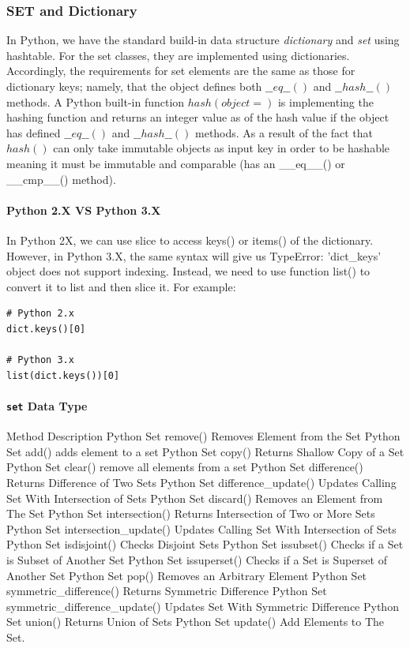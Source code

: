 \documentclass[../main.tex]{subfiles}
\begin{document}
\subsubsection{SET and Dictionary}  In Python, we have the standard build-in data structure \textit{dictionary} and \textit{set} using hashtable. For the set classes, they are implemented using dictionaries. Accordingly, the requirements for set elements are the same as those for dictionary keys; namely, that the object defines both $\_\_eq\_\_()$ and $\_\_hash\_\_()$ methods. A Python built-in function $hash(object=)$ is implementing the hashing function and returns an integer value as of the hash value if the object has defined $\_\_eq\_\_()$ and $\_\_hash\_\_()$ methods. As a result of the fact that $hash()$ can only take immutable objects as input key in order to be hashable  meaning it must be immutable and comparable (has an \_\_eq\_\_() or \_\_cmp\_\_() method). %

\paragraph{Python 2.X VS Python 3.X}
In Python 2X, we can use slice to access keys() or items() of the dictionary. However, in Python 3.X, the same syntax will give us TypeError: 'dict\_keys' object does not support indexing. Instead, we need to use function list() to convert it to list and then slice it. For example:
\begin{lstlisting}
# Python 2.x
dict.keys()[0]

# Python 3.x
list(dict.keys())[0]
\end{lstlisting}

\paragraph{\texttt{set} Data Type} 
Method 	Description
Python Set remove() 	Removes Element from the Set
Python Set add() 	adds element to a set
Python Set copy() 	Returns Shallow Copy of a Set
Python Set clear() 	remove all elements from a set
Python Set difference() 	Returns Difference of Two Sets
Python Set difference\_update() 	Updates Calling Set With Intersection of Sets
Python Set discard() 	Removes an Element from The Set
Python Set intersection() 	Returns Intersection of Two or More Sets
Python Set intersection\_update() 	Updates Calling Set With Intersection of Sets
Python Set isdisjoint() 	Checks Disjoint Sets
Python Set issubset() 	Checks if a Set is Subset of Another Set
Python Set issuperset() 	Checks if a Set is Superset of Another Set
Python Set pop() 	Removes an Arbitrary Element
Python Set symmetric\_difference() 	Returns Symmetric Difference
Python Set symmetric\_difference\_update() 	Updates Set With Symmetric Difference
Python Set union() 	Returns Union of Sets
Python Set update() 	Add Elements to The Set.
\end{document}
